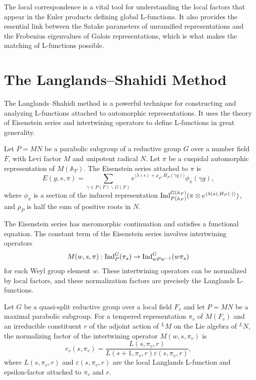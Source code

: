 The local correspondence is a vital tool for understanding the local factors that appear in the Euler products defining global L-functions. It also provides the essential link between the Satake parameters of unramified representations and the Frobenius eigenvalues of Galois representations, which is what makes the matching of L-functions possible.

\section{The Langlands--Shahidi Method}

The Langlands--Shahidi method is a powerful technique for constructing and analyzing L-functions attached to automorphic representations. It uses the theory of Eisenstein series and intertwining operators to define L-functions in great generality.

\begin{definition}
Let \(P = MN\) be a parabolic subgroup of a reductive group \(G\) over a number field \(F\), with Levi factor \(M\) and unipotent radical \(N\). Let \(\pi\) be a cuspidal automorphic representation of \(M(\mathbb{A}_F)\). The Eisenstein series attached to \(\pi\) is
\[
E(g,s,\pi) = \sum_{\gamma \in P(F)\backslash G(F)} e^{\langle \lambda(s) + \rho_P, H_P(\gamma g) \rangle} \phi_\pi(\gamma g),
\]
where \(\phi_\pi\) is a section of the induced representation \(\operatorname{Ind}_{P(\mathbb{A}_F)}^{G(\mathbb{A}_F)} (\pi \otimes e^{\langle \lambda(s), H_P(\cdot) \rangle})\), and \(\rho_P\) is half the sum of positive roots in \(N\).
\end{definition}

The Eisenstein series has meromorphic continuation and satisfies a functional equation. The constant term of the Eisenstein series involves intertwining operators
\[
M(w,s,\pi) : \operatorname{Ind}_{P}^{G} (\pi_s) \to \operatorname{Ind}_{w P w^{-1}}^{G} (w\pi_s)
\]
for each Weyl group element \(w\). These intertwining operators can be normalized by local factors, and these normalization factors are precisely the Langlands L-functions.

\begin{theorem}
Let \(G\) be a quasi-split reductive group over a local field \(F_v\) and let \(P = MN\) be a maximal parabolic subgroup. For a tempered representation \(\pi_v\) of \(M(F_v)\) and an irreducible constituent \(r\) of the adjoint action of \({}^L M\) on the Lie algebra of \({}^L N\), the normalizing factor of the intertwining operator \(M(w,s,\pi_v)\) is
\[
r_v(s,\pi_v) = \frac{L(s,\pi_v,r)}{L(s+1,\pi_v,r) \varepsilon(s,\pi_v,r)},
\]
where \(L(s,\pi_v,r)\) and \(\varepsilon(s,\pi_v,r)\) are the local Langlands L-function and epsilon-factor attached to \(\pi_v\) and \(r\).
\end{theorem}

